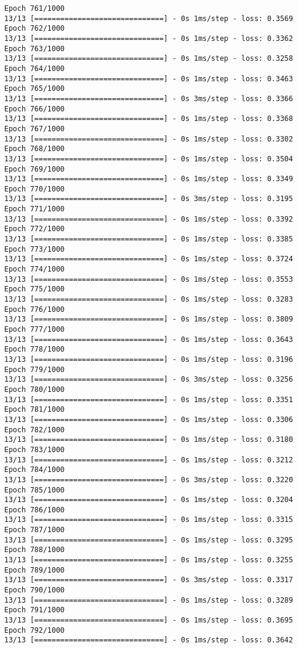 \documentclass[11pt]{article}
\begin{document}
\begin{Verbatim}[commandchars=\\\{\}]
Epoch 761/1000
13/13 [==============================] - 0s 1ms/step - loss: 0.3569
Epoch 762/1000
13/13 [==============================] - 0s 1ms/step - loss: 0.3362
Epoch 763/1000
13/13 [==============================] - 0s 1ms/step - loss: 0.3258
Epoch 764/1000
13/13 [==============================] - 0s 1ms/step - loss: 0.3463
Epoch 765/1000
13/13 [==============================] - 0s 3ms/step - loss: 0.3366
Epoch 766/1000
13/13 [==============================] - 0s 1ms/step - loss: 0.3368
Epoch 767/1000
13/13 [==============================] - 0s 1ms/step - loss: 0.3302
Epoch 768/1000
13/13 [==============================] - 0s 1ms/step - loss: 0.3504
Epoch 769/1000
13/13 [==============================] - 0s 1ms/step - loss: 0.3349
Epoch 770/1000
13/13 [==============================] - 0s 3ms/step - loss: 0.3195
Epoch 771/1000
13/13 [==============================] - 0s 1ms/step - loss: 0.3392
Epoch 772/1000
13/13 [==============================] - 0s 1ms/step - loss: 0.3385
Epoch 773/1000
13/13 [==============================] - 0s 1ms/step - loss: 0.3724
Epoch 774/1000
13/13 [==============================] - 0s 1ms/step - loss: 0.3553
Epoch 775/1000
13/13 [==============================] - 0s 1ms/step - loss: 0.3283
Epoch 776/1000
13/13 [==============================] - 0s 1ms/step - loss: 0.3809
Epoch 777/1000
13/13 [==============================] - 0s 1ms/step - loss: 0.3643
Epoch 778/1000
13/13 [==============================] - 0s 1ms/step - loss: 0.3196
Epoch 779/1000
13/13 [==============================] - 0s 3ms/step - loss: 0.3256
Epoch 780/1000
13/13 [==============================] - 0s 1ms/step - loss: 0.3351
Epoch 781/1000
13/13 [==============================] - 0s 1ms/step - loss: 0.3306
Epoch 782/1000
13/13 [==============================] - 0s 1ms/step - loss: 0.3180
Epoch 783/1000
13/13 [==============================] - 0s 1ms/step - loss: 0.3212
Epoch 784/1000
13/13 [==============================] - 0s 3ms/step - loss: 0.3220
Epoch 785/1000
13/13 [==============================] - 0s 1ms/step - loss: 0.3204
Epoch 786/1000
13/13 [==============================] - 0s 1ms/step - loss: 0.3315
Epoch 787/1000
13/13 [==============================] - 0s 1ms/step - loss: 0.3295
Epoch 788/1000
13/13 [==============================] - 0s 1ms/step - loss: 0.3255
Epoch 789/1000
13/13 [==============================] - 0s 3ms/step - loss: 0.3317
Epoch 790/1000
13/13 [==============================] - 0s 1ms/step - loss: 0.3289
Epoch 791/1000
13/13 [==============================] - 0s 1ms/step - loss: 0.3695
Epoch 792/1000
13/13 [==============================] - 0s 1ms/step - loss: 0.3642

\end{Verbatim}
\end{document}
